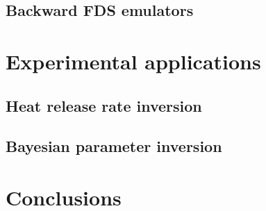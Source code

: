 \documentclass{article}
\begin{document}
\subsection{Backward FDS emulators}
\section{Experimental applications}
\subsection{Heat release rate inversion}
\subsection{Bayesian parameter inversion}
\section{Conclusions}


\end{document}
